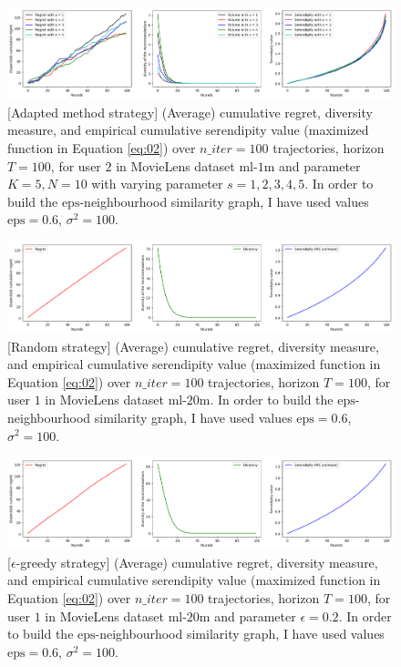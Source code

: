 \documentclass{article}
\begin{document}
\begin{figure}[H]
  \centering
  \includegraphics[scale=0.4]{../Results/ml-1m/lagree.png}
  \caption{[Adapted method strategy] (Average) cumulative regret, diversity measure, and empirical cumulative serendipity value (maximized function in Equation \ref{eq:02}) over $n\_iter=100$ trajectories, horizon $T=100$, for user $2$ in MovieLens dataset $\text{ml-1m}$ and parameter $K=5, N=10$ with varying parameter $s=1, 2, 3, 4, 5$. In order to build the $\text{eps}$-neighbourhood similarity graph, I have used values $\text{eps}=0.6$, $\sigma^{2}=100$.}
\label{figlagreecomp}
\end{figure}

\begin{figure}[H]
  \centering
  \includegraphics[scale=0.4]{../Results/ml-20m/random-48sec.png}
  \caption{[Random strategy] (Average) cumulative regret, diversity measure, and empirical cumulative serendipity value (maximized function in Equation \ref{eq:02}) over $n\_iter=100$ trajectories, horizon $T=100$, for user $1$ in MovieLens dataset $\text{ml-20m}$. In order to build the $\text{eps}$-neighbourhood similarity graph, I have used values $\text{eps}=0.6$, $\sigma^{2}=100$.}
\label{figrandom}
\end{figure}

\begin{figure}[H]
  \centering
  \includegraphics[scale=0.4]{../Results/ml-20m/greedy-2min16sec.png}
  \caption{[$\epsilon$-greedy strategy] (Average) cumulative regret, diversity measure, and empirical cumulative serendipity value (maximized function in Equation \ref{eq:02}) over $n\_iter=100$ trajectories, horizon $T=100$, for user $1$ in MovieLens dataset $\text{ml-20m}$ and parameter $\epsilon=0.2$. In order to build the $\text{eps}$-neighbourhood similarity graph, I have used values $\text{eps}=0.6$, $\sigma^{2}=100$.}
\label{figgreedy}
\end{figure}
\end{document}

